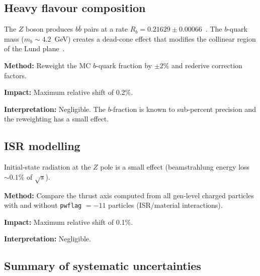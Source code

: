 \documentclass[11pt,a4paper]{article}
\begin{document}
\subsection{Heavy flavour composition}
\label{sec:syst-heavy-flavour}

The $Z$ boson produces $b\bar{b}$ pairs at a rate $R_b = 0.21629
\pm 0.00066$~\cite{ParticleDataGroup:2024cfk}.  The $b$-quark mass
($m_b \sim 4.2$~GeV) creates a dead-cone effect that modifies the
collinear region of the Lund plane~\cite{LHCb:2025viq}.

\textbf{Method:} Reweight the MC $b$-quark fraction by
$\pm 2\%$ and rederive correction factors.

\textbf{Impact:} Maximum relative shift of 0.2\%.

\textbf{Interpretation:} Negligible.  The $b$-fraction is known to
sub-percent precision and the reweighting has a small effect.

\subsection{ISR modelling}
\label{sec:syst-isr}

Initial-state radiation at the $Z$ pole is a small effect
(beamstrahlung energy loss $\sim\!0.1\%$ of $\sqrt{s}$).

\textbf{Method:} Compare the thrust axis computed from all gen-level
charged particles with and without \texttt{pwflag} $= -11$ particles
(ISR/material interactions).

\textbf{Impact:} Maximum relative shift of 0.1\%.

\textbf{Interpretation:} Negligible.

\subsection{Summary of systematic uncertainties}
\label{sec:syst-summary}
\end{document}
